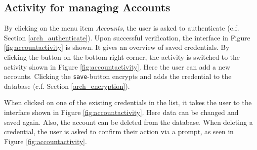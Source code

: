
\subsection{Activity for managing Accounts}
By clicking on the menu item \textit{Accounts}, the user is asked to authenticate (c.f. Section \ref{arch_authenticate}). Upon successful verification, the interface in Figure \ref{fig:accountactivity}\protect{} is shown. It gives an overview of saved credentials. By clicking the button on the bottom right corner, the activity is switched to the activity shown in Figure \ref{fig:accountactivity}\protect{}. Here the user can add a new accounts. Clicking the \texttt{save}-button encrypts and adds the credential to the database (c.f. Section \ref{arch_encryption}).

When clicked on one of the existing credentials in the list, it takes the user to the interface shown in Figure \ref{fig:accountactivity}\protect{}.  Here data can be changed and saved again. Also, the account can be deleted from the database. When deleting a credential, the user is asked to confirm their action via a prompt, as seen in Figure \ref{fig:accountactivity}\protect{}.

